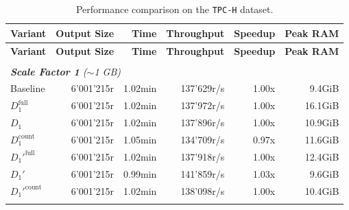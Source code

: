\begin{longtable}{lrrrrr}
    
    \caption[TPC-H Performance Comparison]{Performance comparison on the \texttt{TPC-H} dataset.}
    \label{tab:results_tpc-h} \\

    \toprule
    \textbf{Variant}      & \textbf{Output Size}  & \textbf{Time}       & \textbf{Throughput}   & \textbf{Speedup}  & \textbf{Peak RAM} \\
    \midrule
    \endfirsthead 

    \toprule
    \textbf{Variant}      & \textbf{Output Size}  & \textbf{Time}       & \textbf{Throughput}   & \textbf{Speedup}  & \textbf{Peak RAM} \\
    \midrule
    \endhead 

    \bottomrule
    \endfoot  

    \endlastfoot 

    
    \multicolumn{6}{l}{\textit{4 Table Path Query}} \\
    \midrule
    \multicolumn{6}{l}{\textit{\textbf{Scale Factor 1} ($\sim$1 GB)}} \\
    \nopagebreak
    Baseline              &  6'001'215r           &  1.02min             &  137'629r/s          & 1.00x             & 9.4GiB    \\
    $D_1^{\text{full}}$   &  6'001'215r           &  1.02min             &  137'972r/s          & 1.00x             & 16.1GiB   \\
    \quad $D_1$           &  6'001'215r           &  1.02min             &  137'896r/s          & 1.00x             & 10.9GiB   \\
    $D_1^{\text{count}}$  &  6'001'215r           &  1.05min             &  134'709r/s          & 0.97x             & 11.6GiB   \\
    $D_1'^{\text{full}}$  &  6'001'215r           &  1.02min             &  137'918r/s          & 1.00x             & 12.4GiB   \\
    \quad $D_1'$          &  6'001'215r           &  0.99min             &  141'859r/s          & 1.03x             & 9.6GiB    \\
    $D_1'^{\text{count}}$ &  6'001'215r           &  1.02min             &  138'098r/s          & 1.00x             & 10.4GiB   \\
    \addlinespace
    

\end{longtable}
